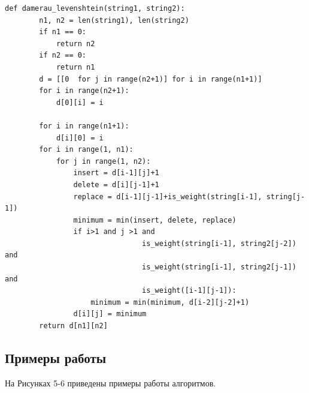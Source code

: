 \documentclass[a4paper]{article}
\begin{document}
	\clearpage
	\begin{lstlisting}[label=damerau-leven,caption= Алгоритм для нахождения расстояния Дамерау-Левенштейна(итеративная реализация)]
		def damerau_levenshtein(string1, string2):
		n1, n2 = len(string1), len(string2)
		if n1 == 0:
			return n2
		if n2 == 0:
			return n1
		d = [[0  for j in range(n2+1)] for i in range(n1+1)]
		for i in range(n2+1):
			d[0][i] = i
		
		for i in range(n1+1):
			d[i][0] = i
		for i in range(1, n1):
			for j in range(1, n2):
				insert = d[i-1][j]+1
				delete = d[i][j-1]+1
				replace = d[i-1][j-1]+is_weight(string[i-1], string[j-1])
				minimum = min(insert, delete, replace)
				if i>1 and j >1 and
								is_weight(string[i-1], string2[j-2]) and
								is_weight(string[i-1], string2[j-1]) and
								is_weight([i-1][j-1]):
					minimum = min(minimum, d[i-2][j-2]+1)
				d[i][j] = minimum
		return d[n1][n2]
	\end{lstlisting}
	\clearpage 
	
	\subsection{Примеры работы}
	На Рисунках 5-6 приведены примеры работы алгоритмов.
	
\end{document}
